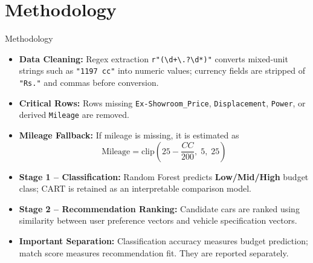 \documentclass[aspectratio=169]{beamer}
\begin{document}
\section{Methodology}
\begin{frame}{Methodology}
  \begin{itemize}
    \setlength\itemsep{0.45em}
    \item \textbf{Data Cleaning:} Regex extraction \texttt{r"(\textbackslash d+\textbackslash.?\textbackslash d*)"} converts mixed-unit strings
          such as \texttt{"1197 cc"} into numeric values; currency fields are stripped of \texttt{"Rs."}
          and commas before conversion.
    \item \textbf{Critical Rows:} Rows missing \texttt{Ex-Showroom\_Price}, \texttt{Displacement},
          \texttt{Power}, or derived \texttt{Mileage} are removed.
    \item \textbf{Mileage Fallback:} If mileage is missing, it is estimated as
          \[
            \text{Mileage} = \text{clip}\!\left(25 - \frac{CC}{200},\; 5,\; 25\right)
          \]
    \item \textbf{Stage 1 -- Classification:} Random Forest predicts \textbf{Low/Mid/High}
          budget class; CART is retained as an interpretable comparison model.
    \item \textbf{Stage 2 -- Recommendation Ranking:} Candidate cars are ranked using
          similarity between user preference vectors and vehicle specification vectors.
    \item \textbf{Important Separation:} Classification accuracy measures budget prediction;
          match score measures recommendation fit. They are reported separately.
  \end{itemize}
\end{frame}
\end{document}
